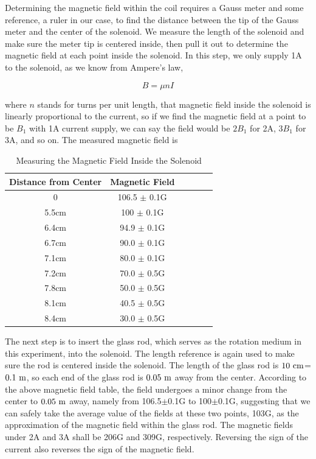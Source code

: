 \documentclass[prb,preprint]{revtex4-1}
\begin{document}
Determining the magnetic field within the coil requires a Gauss meter and some reference, a ruler in our case, to find the distance between the tip of the Gauss meter and the center of the solenoid. We measure the length of the solenoid and make sure the meter tip is centered inside, then pull it out to determine the magnetic field at each point inside the solenoid. In this step, we only supply 1A to the solenoid, as we know from Ampere's law,

\begin{equation}
\label{Ampere}
B=\mu nI
\end{equation}

where $n$ stands for turns per unit length, that magnetic field inside the solenoid is linearly proportional to the current, so if we find the magnetic field at a point to be $B_1$ with 1A current supply, we can say the field would be $2B_1$ for 2A, $3B_1$ for 3A, and so on. The measured magnetic field is

\begin{table}[H]
\centering
\caption{Measuring the Magnetic Field Inside the Solenoid}
\begin{ruledtabular}
\begin{tabular}{c c c c c c}
Distance from Center & Magnetic Field\\
\hline
0                    & 106.5 $\pm$ 0.1G \\ 
5.5cm                & 100 $\pm$ 0.1G   \\ 
6.4cm                & 94.9 $\pm$ 0.1G  \\ 
6.7cm                & 90.0 $\pm$ 0.1G  \\ 
7.1cm                & 80.0 $\pm$ 0.1G  \\ 
7.2cm                & 70.0 $\pm$ 0.5G  \\ 
7.8cm                & 50.0 $\pm$ 0.5G  \\ 
8.1cm                & 40.5 $\pm$ 0.5G  \\ 
8.4cm                & 30.0 $\pm$ 0.5G  \\ 

\end{tabular}
\end{ruledtabular}
\label{AnglevsB}
\end{table}

The next step is to insert the glass rod, which serves as the rotation medium in this experiment, into the solenoid. The length reference is again used to make sure the rod is centered inside the solenoid. The length of the glass rod is $10 \rm{\ cm}$=$0.1 \rm{\ m}$, so each end of the glass rod is $0.05 \rm{\ m}$ away from the center. According to the above magnetic field table, the field undergoes a minor change from the center to $0.05 \rm{\ m}$ away, namely from 106.5$\pm$0.1G to 100$\pm$0.1G, suggesting that we can safely take the average value of the fields at these two points, 103G, as the approximation of the magnetic field within the glass rod. The magnetic fields under 2A and 3A shall be 206G and 309G, respectively. Reversing the sign of the current also reverses the sign of the magnetic field.
\end{document}
